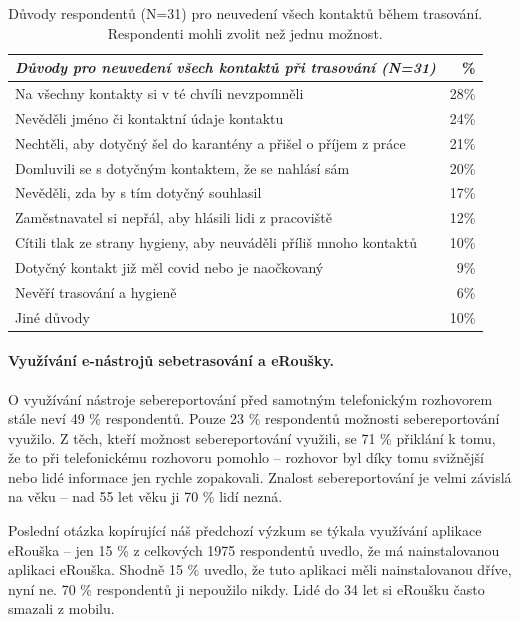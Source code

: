 \begin{table}
\begin{center}
\begin{tabular}{|l|r|}
\hline
\emph{Důvody pro neuvedení všech kontaktů při trasování (N=31)} &  \% \\
\hline \hline
Na všechny kontakty si v té chvíli nevzpomněli & 28\% \\
Nevěděli jméno či kontaktní údaje kontaktu & 24\% \\
Nechtěli, aby dotyčný šel do karantény a přišel o příjem z práce & 21\% \\
Domluvili se s dotyčným kontaktem, že se nahlásí sám & 20\% \\
Nevěděli, zda by s tím dotyčný souhlasil & 17\% \\
Zaměstnavatel si nepřál, aby hlásili lidi z pracoviště & 12\% \\
Cítili tlak ze strany hygieny, aby neuváděli příliš mnoho kontaktů & 10\% \\
Dotyčný kontakt již měl covid nebo je naočkovaný & 9\% \\
Nevěří trasování a hygieně & 6\% \\
Jiné důvody & 10\% \\
\hline
\end{tabular}
\end{center}
\caption{Důvody respondentů (N=31) pro neuvedení všech kontaktů během trasování. Respondenti mohli zvolit než jednu možnost.}
\end{table}

\paragraph*{Využívání e-nástrojů sebetrasování a eRoušky.}
O využívání nástroje sebereportování před samotným telefonickým rozhovorem stále neví 49 \% respondentů. Pouze 23 \% respondentů možnosti sebereportování využilo. Z těch, kteří možnost sebereportování využili, se 71 \% přiklání k tomu, že to při telefonickému rozhovoru pomohlo -- rozhovor byl díky tomu svižnější nebo lidé informace jen rychle zopakovali. Znalost sebereportování je velmi závislá na věku -- nad 55 let věku ji 70 \% lidí nezná. 

Poslední otázka kopírující náš předchozí výzkum se týkala využívání aplikace eRouška -- jen 15 \% z celkových 1975 respondentů uvedlo, že má nainstalovanou aplikaci eRouška. Shodně 15 \% uvedlo, že tuto aplikaci měli nainstalovanou dříve, nyní ne. 70 \% respondentů ji nepoužilo nikdy. Lidé do 34 let si eRoušku často smazali z mobilu. 

